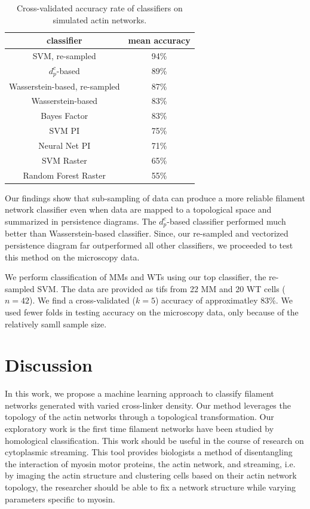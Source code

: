 \documentclass[10pt]{article}
\begin{document}
\begin{table}[H]
	\begin{center}
		\begin{tabular}{c|c}
			\hline
			\textbf{classifier} & \textbf{mean accuracy} \\
			\hline
			SVM, re-sampled & 94\%  \\
			\hline
			$d^c_p$-based & 89\%  \\
			\hline
			Wasserstein-based, re-sampled & 87\%  \\
			\hline
			Wasserstein-based & 83\%  \\
			\hline
			Bayes Factor \cite{maroulas2019bayesian} & 83\%  \\
			\hline
			SVM PI \cite{adams2017persistence} & 75\%  \\
			\hline
			Neural Net PI & 71\%  \\
			\hline
			SVM Raster & 65\%  \\
			\hline
			Random Forest Raster & 55\%  \\
			\hline
		\end{tabular}
		\caption{Cross-validated accuracy rate of classifiers on simulated actin networks.}\label{tab:accuracyrate}
	\end{center}
\end{table}

Our findings show that sub-sampling of data can produce a more reliable filament network classifier even when data are mapped to a topological space and summarized in persistence diagrams. The $d^c_p$-based classifier performed much better than Wasserstein-based classifier. Since, our re-sampled and vectorized persistence diagram far outperformed all other classifiers, we proceeded to test this method on the microscopy data.

We perform classification of MMs and WTs using our top classifier, the re-sampled SVM. The data are provided as tifs from 22 MM and 20 WT cells ($n=42$). We find a cross-validated ($k=5$) accuracy of approximatley 83\%. We used fewer folds in testing accuracy on the microscopy data, only because of the relatively samll sample size.

\section{Discussion}\label{sec:discussion}
In this work, we propose a machine learning approach to classify filament networks generated with varied cross-linker density. Our method leverages the topology of the actin networks through a topological transformation. Our exploratory work is the first time filament networks have been studied by homological classification. This work should be useful in the course of research on cytoplasmic streaming. This tool provides biologists a method of disentangling the interaction of myosin motor proteins, the actin network, and streaming, i.e. by imaging the actin structure and clustering cells based on their actin network topology, the researcher should be able to fix a network structure while varying parameters specific to myosin.
\end{document}
